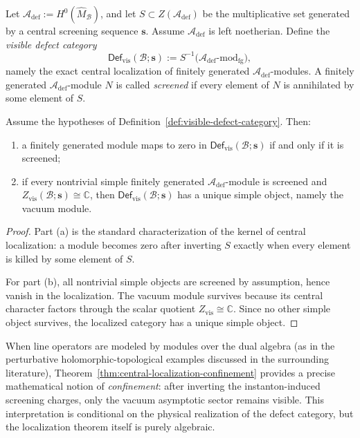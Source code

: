 \begin{definition}
\label{def:visible-defect-category}
Let $\mathcal A_{\mathrm{def}}:=H^0(\widehat M_{\mathcal B})$, and let $S\subset Z(\mathcal A_{\mathrm{def}})$ be the
multiplicative set generated by a central screening sequence $\mathbf s$.
Assume $\mathcal A_{\mathrm{def}}$ is left noetherian.
Define the \emph{visible defect category}
\[
\mathsf{Def}_{\mathrm{vis}}(\mathcal B;\mathbf s)
:=S^{-1}\bigl(\mathcal A_{\mathrm{def}}\text{-}\mathrm{mod}_{\mathrm{fg}}\bigr),
\]
namely the exact central localization of finitely generated $\mathcal A_{\mathrm{def}}$-modules.
A finitely generated $\mathcal A_{\mathrm{def}}$-module $N$ is called \emph{screened} if every element of $N$
is annihilated by some element of $S$.
\end{definition}

\begin{theorem}
\label{thm:central-localization-confinement}
Assume the hypotheses of Definition~\ref{def:visible-defect-category}.
Then:
\begin{enumerate}[label=(\alph*)]
\item a finitely generated module maps to zero in $\mathsf{Def}_{\mathrm{vis}}(\mathcal B;\mathbf s)$ if and only if it is screened;
\item if every nontrivial simple finitely generated $\mathcal A_{\mathrm{def}}$-module is screened and
$Z_{\mathrm{vis}}(\mathcal B;\mathbf s)\cong \mathbb C$, then $\mathsf{Def}_{\mathrm{vis}}(\mathcal B;\mathbf s)$ has a unique simple object,
namely the vacuum module.
\end{enumerate}
\end{theorem}

\begin{proof}
Part (a) is the standard characterization of the kernel of central localization: a module becomes zero after
inverting $S$ exactly when every element is killed by some element of $S$.

For part (b), all nontrivial simple objects are screened by assumption, hence vanish in the localization.
The vacuum module survives because its central character factors through the scalar quotient
$Z_{\mathrm{vis}}\cong \mathbb C$.  Since no other simple object survives, the localized category has a unique
simple object.
\end{proof}

\begin{remark}
\label{rem:physical-interpretation-confinement}
When line operators are modeled by modules over the dual algebra (as in the perturbative holomorphic-topological
examples discussed in the surrounding literature), Theorem~\ref{thm:central-localization-confinement}
provides a precise mathematical notion of \emph{confinement}: after inverting the instanton-induced screening
charges, only the vacuum asymptotic sector remains visible.
This interpretation is conditional on the physical realization of the defect category, but the localization theorem itself is purely algebraic.
\end{remark}


